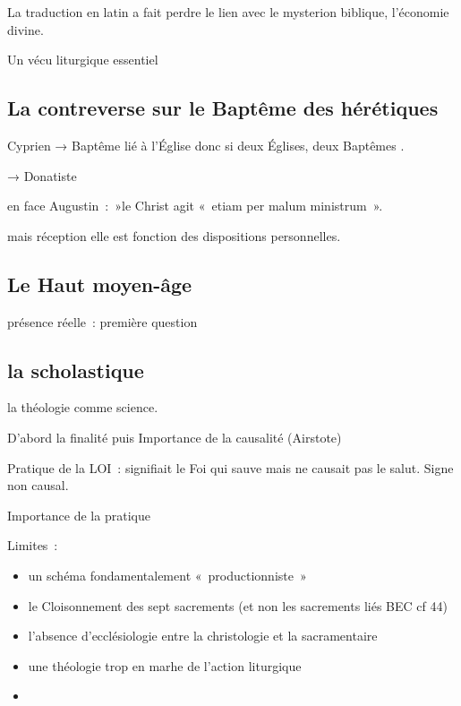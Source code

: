 La traduction en latin a fait perdre le lien avec le mysterion biblique,
l'économie divine.

Un vécu liturgique essentiel

\hypertarget{la-contreverse-sur-le-baptuxeame-des-huxe9ruxe9tiques}{%
\subsection{La contreverse sur le Baptême des
hérétiques}\label{la-contreverse-sur-le-baptuxeame-des-huxe9ruxe9tiques}}

Cyprien → Baptême lié à l'Église donc si deux Églises, deux Baptêmes .

→ Donatiste

en face Augustin~:~»le Christ agit «~etiam per malum ministrum~».

mais réception elle est fonction des dispositions personnelles.

\hypertarget{le-haut-moyen-uxe2ge}{%
\subsection{Le Haut moyen-âge}\label{le-haut-moyen-uxe2ge}}

présence réelle~: première question

\hypertarget{la-scholastique}{%
\subsection{la scholastique}\label{la-scholastique}}

la théologie comme science.

D'abord la finalité puis Importance de la causalité (Airstote)

Pratique de la LOI~: signifiait le Foi qui sauve mais ne causait pas le
salut. Signe non causal.

Importance de la pratique

Limites~:

\begin{itemize}
\item
  un schéma fondamentalement «~productionniste~»
\item
  le Cloisonnement des sept sacrements (et non les sacrements liés BEC
  cf 44)
\item
  l'absence d'ecclésiologie entre la christologie et la sacramentaire
\item
  une théologie trop en marhe de l'action liturgique
\item
\end{itemize}

